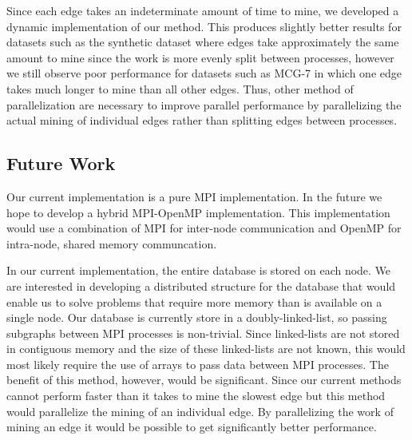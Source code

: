 Since each edge takes an indeterminate amount of time to mine, we developed
a dynamic implementation of our method. This produces slightly better results
for datasets such as the synthetic dataset where edges take approximately
the same amount to mine since the work is more evenly split between processes,
however we still observe poor performance for datasets such as MCG-7 in which
one edge takes much longer to mine than all other edges.
Thus, other method of parallelization are necessary to improve parallel
performance by parallelizing the actual mining of individual edges rather
than splitting edges between processes.

\subsection{Future Work}
\label{subsec:future}

Our current implementation is a pure MPI implementation. In the future we
hope to develop a hybrid MPI-OpenMP implementation. This implementation
would use a combination of MPI for inter-node communication and OpenMP
for intra-node, shared memory communcation.

In our current implementation, the entire database is stored on each node.
We are interested in developing a distributed structure for the database that
would enable us to solve problems that require more memory than is available
on a single node. Our database is currently store in a doubly-linked-list, so
passing subgraphs between MPI processes is non-trivial. Since
linked-lists are not stored in contiguous memory and the size of these
linked-lists are not known, this would most likely require the use of arrays
to pass data between MPI processes.
The benefit of this method, however, would be significant. Since our current
methods cannot perform faster than it takes to mine the slowest edge but this
method would parallelize the mining of an individual edge. By parallelizing
the work of mining an edge it would be possible to get significantly better
performance.
